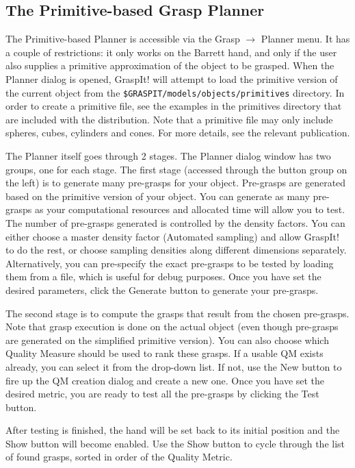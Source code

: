 \subsection{The Primitive-based Grasp Planner}

The Primitive-based Planner is accessible via the Grasp $\rightarrow$ Planner
menu. It has a couple of restrictions: it only works on the Barrett
hand, and only if the user also supplies a primitive approximation of
the object to be grasped. When the Planner dialog is opened, GraspIt!
will attempt to load the primitive version of the current object from
the \texttt{\$GRASPIT/models/objects/primitives} directory. In order
to create a primitive file, see the examples in the primitives
directory that are included with the distribution. Note that a
primitive file may only include spheres, cubes, cylinders and
cones. For more details, see the relevant publication.

The Planner itself goes through 2 stages. The Planner dialog window
has two groups, one for each stage. The first stage (accessed through
the button group on the left) is to generate many pre-grasps for your
object. Pre-grasps are generated based on the primitive version of
your object. You can generate as many pre-grasps as your computational
resources and allocated time will allow you to test. The number of
pre-grasps generated is controlled by the density factors. You can
either choose a master density factor (Automated sampling) and allow
GraspIt! to do the rest, or choose sampling densities along different
dimensions separately. Alternatively, you can pre-specify the exact
pre-grasps to be tested by loading them from a file, which is useful
for debug purposes. Once you have set the desired parameters, click
the Generate button to generate your pre-grasps.

The second stage is to compute the grasps that result from the chosen
pre-grasps. Note that grasp execution is done on the actual object
(even though pre-grasps are generated on the simplified primitive
version). You can also choose which Quality Measure should be used to
rank these grasps. If a usable QM exists already, you can select it
from the drop-down list. If not, use the New button to fire up the QM
creation dialog and create a new one. Once you have set the desired
metric, you are ready to test all the pre-grasps by clicking the Test
button.

After testing is finished, the hand will be set back to its initial
position and the Show button will become enabled. Use the Show button
to cycle through the list of found grasps, sorted in order of the
Quality Metric.

